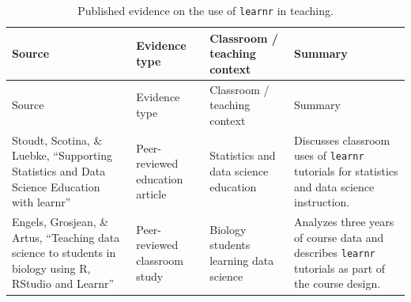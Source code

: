 \documentclass[
  12pt]{article}
\begin{document}
\begin{longtable}[]{@{}
  >{\raggedright\arraybackslash}p{}
  >{\raggedright\arraybackslash}p{}
  >{\raggedright\arraybackslash}p{}
  >{\raggedright\arraybackslash}p{}@{}}
\caption{Published evidence on the use of \texttt{learnr} in
teaching.}\label{tbl-evidence-learnr}\tabularnewline
\toprule\noalign{}
\begin{minipage}[b]{\linewidth}\raggedright
Source
\end{minipage} & \begin{minipage}[b]{\linewidth}\raggedright
Evidence type
\end{minipage} & \begin{minipage}[b]{\linewidth}\raggedright
Classroom / teaching context
\end{minipage} & \begin{minipage}[b]{\linewidth}\raggedright
Summary
\end{minipage} \\
\midrule\noalign{}
\endfirsthead
\toprule\noalign{}
\begin{minipage}[b]{\linewidth}\raggedright
Source
\end{minipage} & \begin{minipage}[b]{\linewidth}\raggedright
Evidence type
\end{minipage} & \begin{minipage}[b]{\linewidth}\raggedright
Classroom / teaching context
\end{minipage} & \begin{minipage}[b]{\linewidth}\raggedright
Summary
\end{minipage} \\
\midrule\noalign{}
\endhead
\bottomrule\noalign{}
\endlastfoot
Stoudt, Scotina, \& Luebke, ``Supporting Statistics and Data Science
Education with learnr'' \citep{Stoudt.Scotina.Luebke:2022} &
Peer-reviewed education article & Statistics and data science education
& Discusses classroom uses of \texttt{learnr} tutorials for statistics
and data science instruction. \\
Engels, Grosjean, \& Artus, ``Teaching data science to students in
biology using R, RStudio and Learnr'' \citep{engels2023learnrbiology} &
Peer-reviewed classroom study & Biology students learning data science &
Analyzes three years of course data and describes \texttt{learnr}
tutorials as part of the course design. \\

\end{longtable}
\end{document}
